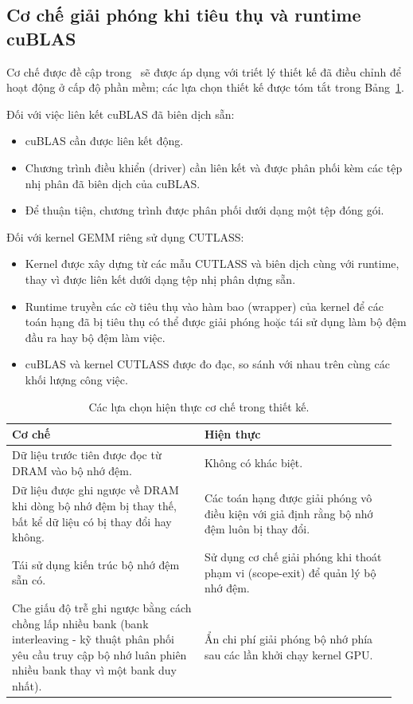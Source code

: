 \documentclass[a4paper]{article}
\begin{document}
	\subsection{Cơ chế giải phóng khi tiêu thụ và runtime cuBLAS}
	Cơ chế được đề cập trong~\cite{DybdahlKGN06} sẽ được áp dụng với triết lý thiết kế đã điều chỉnh để hoạt động ở cấp độ phần mềm; các lựa chọn thiết kế được tóm tắt trong Bảng~\ref{tab:scheme_implementation}.

	Đối với việc liên kết cuBLAS đã biên dịch sẵn:
	\begin{itemize}
		\item cuBLAS cần được liên kết động.
		\item Chương trình điều khiển (driver) cần liên kết và được phân phối kèm các tệp nhị phân đã biên dịch của cuBLAS.
		\item Để thuận tiện, chương trình được phân phối dưới dạng một tệp đóng gói.
	\end{itemize}

	Đối với kernel GEMM riêng sử dụng CUTLASS:
	\begin{itemize}
		\item Kernel được xây dựng từ các mẫu CUTLASS và biên dịch cùng với runtime, thay vì được liên kết dưới dạng tệp nhị phân dựng sẵn.
		\item Runtime truyền các cờ tiêu thụ vào hàm bao (wrapper) của kernel để các toán hạng đã bị tiêu thụ có thể được giải phóng hoặc tái sử dụng làm bộ đệm đầu ra hay bộ đệm làm việc.
		\item cuBLAS và kernel CUTLASS được đo đạc, so sánh với nhau trên cùng các khối lượng công việc.
	\end{itemize}
	
	\begin{table}[H]
  \centering
  \caption{Các lựa chọn hiện thực cơ chế trong thiết kế.}
  \label{tab:scheme_implementation}
  \begin{tabular}{@{}>{\RaggedRight}p{0.48\linewidth} >{\RaggedRight}p{0.48\linewidth}@{}}
    \toprule
    \textbf{Cơ chế} & \textbf{Hiện thực} \\
    \midrule
    Dữ liệu trước tiên được đọc từ DRAM vào bộ nhớ đệm. 
      & Không có khác biệt. \\ \addlinespace
    
    Dữ liệu được ghi ngược về DRAM khi dòng bộ nhớ đệm bị thay thế, bất kể dữ liệu có bị thay đổi hay không. 
      & Các toán hạng được giải phóng vô điều kiện với giả định rằng bộ nhớ đệm luôn bị thay đổi. \\ \addlinespace
    
    Tái sử dụng kiến trúc bộ nhớ đệm sẵn có. 
      & Sử dụng cơ chế giải phóng khi thoát phạm vi (scope-exit) để quản lý bộ nhớ đệm. \\ \addlinespace
    
    Che giấu độ trễ ghi ngược bằng cách chồng lấp nhiều bank (bank interleaving - kỹ thuật phân phối yêu cầu truy cập bộ nhớ luân phiên nhiều bank thay vì một bank duy nhất). 
      & Ẩn chi phí giải phóng bộ nhớ phía sau các lần khởi chạy kernel GPU. \\
    \bottomrule
  \end{tabular}
\end{table}
\end{document}
